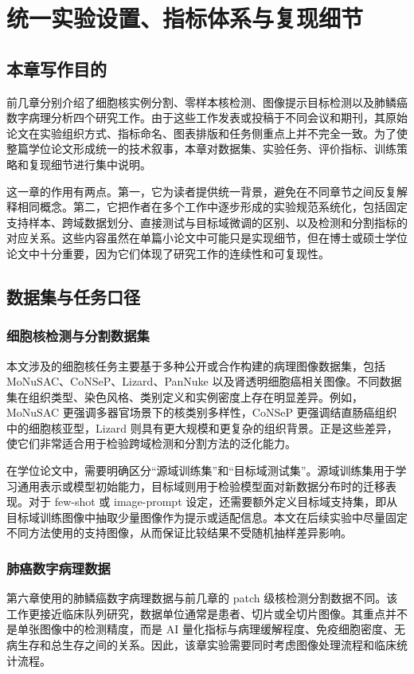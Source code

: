 \chapter{统一实验设置、指标体系与复现细节}

\section{本章写作目的}
前几章分别介绍了细胞核实例分割、零样本核检测、图像提示目标检测以及肺鳞癌数字病理分析四个研究工作。由于这些工作发表或投稿于不同会议和期刊，其原始论文在实验组织方式、指标命名、图表排版和任务侧重点上并不完全一致。为了使整篇学位论文形成统一的技术叙事，本章对数据集、实验任务、评价指标、训练策略和复现细节进行集中说明。

这一章的作用有两点。第一，它为读者提供统一背景，避免在不同章节之间反复解释相同概念。第二，它把作者在多个工作中逐步形成的实验规范系统化，包括固定支持样本、跨域数据划分、直接测试与目标域微调的区别、以及检测和分割指标的对应关系。这些内容虽然在单篇小论文中可能只是实现细节，但在博士或硕士学位论文中十分重要，因为它们体现了研究工作的连续性和可复现性。

\section{数据集与任务口径}
\subsection{细胞核检测与分割数据集}
本文涉及的细胞核任务主要基于多种公开或合作构建的病理图像数据集，包括 MoNuSAC、CoNSeP、Lizard、PanNuke 以及肾透明细胞癌相关图像。不同数据集在组织类型、染色风格、类别定义和实例密度上存在明显差异。例如，MoNuSAC 更强调多器官场景下的核类别多样性，CoNSeP 更强调结直肠癌组织中的细胞核亚型，Lizard 则具有更大规模和更复杂的组织背景。正是这些差异，使它们非常适合用于检验跨域检测和分割方法的泛化能力。

在学位论文中，需要明确区分“源域训练集”和“目标域测试集”。源域训练集用于学习通用表示或模型初始能力，目标域则用于检验模型面对新数据分布时的迁移表现。对于 few-shot 或 image-prompt 设定，还需要额外定义目标域支持集，即从目标域训练图像中抽取少量图像作为提示或适配信息。本文在后续实验中尽量固定不同方法使用的支持图像，从而保证比较结果不受随机抽样差异影响。

\subsection{肺癌数字病理数据}
第六章使用的肺鳞癌数字病理数据与前几章的 patch 级核检测分割数据不同。该工作更接近临床队列研究，数据单位通常是患者、切片或全切片图像。其重点并不是单张图像中的检测精度，而是 AI 量化指标与病理缓解程度、免疫细胞密度、无病生存和总生存之间的关系。因此，该章实验需要同时考虑图像处理流程和临床统计流程。

